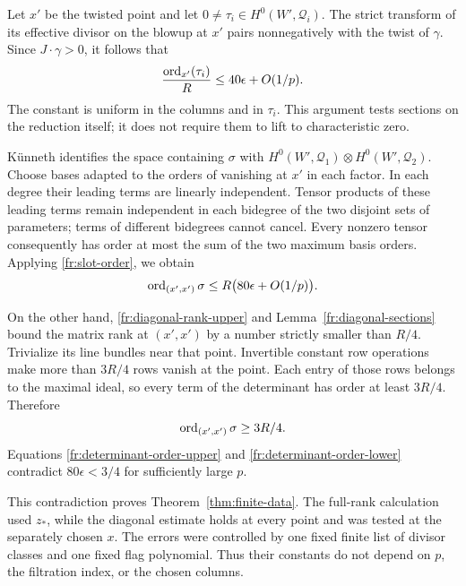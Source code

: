 Let $x'$ be the twisted point and let $0\ne\tau_i\in
H^0(W',\mathcal Q_i)$.  The strict transform of its effective divisor on
the blowup at $x'$ pairs nonnegatively with the twist of $\gamma$.
Since $J\cdot\gamma>0$, it follows that
\begin{equation}\label{fr:slot-order}
 \frac{\operatorname{ord}_{x'}(\tau_i)}R\le40\epsilon+O(1/p).
\end{equation}
The constant is uniform in the columns and in $\tau_i$.  This
argument tests sections on the reduction itself; it does not
require them to lift to characteristic zero.

K\"unneth identifies the space containing $\sigma$ with
$H^0(W',\mathcal Q_1)\otimes H^0(W',\mathcal Q_2)$.  Choose bases adapted to the
orders of vanishing at $x'$ in each factor.  In each degree their
leading terms are linearly independent.  Tensor products of these
leading terms remain independent in each bidegree of the two
disjoint sets of parameters; terms of different bidegrees cannot
cancel.  Every nonzero tensor consequently has order at most the
sum of the two maximum basis orders.  Applying
\eqref{fr:slot-order}, we obtain
\begin{equation}\label{fr:determinant-order-upper}
 \operatorname{ord}_{(x',x')}\sigma\le R\bigl(80\epsilon+O(1/p)\bigr).
\end{equation}

On the other hand, \eqref{fr:diagonal-rank-upper} and
Lemma~\ref{fr:diagonal-sections} bound the matrix rank at $(x',x')$
by a number strictly smaller
than $R/4$.  Trivialize its line bundles near that point.  Invertible
constant row operations make more than $3R/4$ rows vanish at the
point.  Each entry of those rows belongs to the maximal ideal, so
every term of the determinant has order at least $3R/4$.  Therefore
\begin{equation}\label{fr:determinant-order-lower}
 \operatorname{ord}_{(x',x')}\sigma\ge3R/4.
\end{equation}
Equations \eqref{fr:determinant-order-upper} and
\eqref{fr:determinant-order-lower} contradict
$80\epsilon<3/4$ for sufficiently large $p$.


This contradiction proves Theorem~\ref{thm:finite-data}.
The full-rank calculation used $z_*$, while the diagonal estimate
holds at every point and was tested at the separately chosen $x$.
The errors were controlled by one fixed finite list of divisor
classes and one fixed flag polynomial. Thus their constants do
not depend on $p$, the filtration index, or the chosen columns.

